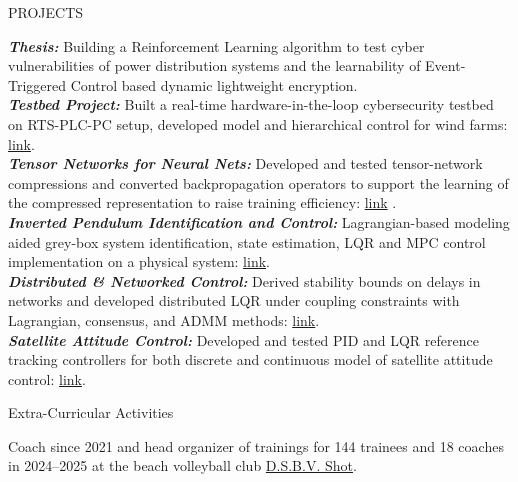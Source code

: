 \documentclass{resume} %
\begin{document}

\begin{rSection}{PROJECTS}


\textbf{\textit{Thesis:}} Building a Reinforcement Learning algorithm to test cyber vulnerabilities of power distribution systems and the learnability of Event-Triggered Control based dynamic lightweight encryption. \vspace*{1mm}\\
\textbf{\textit{Testbed Project:}} Built a real-time hardware-in-the-loop cybersecurity testbed on RTS-PLC-PC setup, developed model and hierarchical control for wind farms: \href{https://github.com/arondomotorkohlheb/off_testbed}{link}. \vspace*{1mm}\\
\textbf{\textit{Tensor Networks for Neural Nets:}} Developed and tested tensor-network compressions and converted backpropagation operators to support the learning of the compressed representation to raise training efficiency: \href{}{link} \vspace*{1mm}.\\
\textbf{\textit{Inverted Pendulum Identification and Control:}} Lagrangian-based modeling aided grey-box system identification, state estimation, LQR and MPC control implementation on a physical system: \href{}{link}.\vspace*{1mm}\\
\textbf{\textit{Distributed \& Networked Control:}} Derived stability bounds on delays in networks and developed distributed LQR under coupling constraints with Lagrangian, consensus, and ADMM methods: \href{}{link}. \vspace*{1mm}\\
\textbf{\textit{Satellite Attitude Control:}} Developed and tested PID and LQR reference tracking controllers for both discrete and continuous model of satellite attitude control: \href{}{link}.
\end{rSection}
\begin{rSection}{Extra-Curricular Activities} 

Coach since 2021 and head organizer of trainings for 144 trainees and 18 coaches in 2024--2025 at the beach volleyball club \href{https://www.shotbeach.nl/}{D.S.B.V. Shot}. 


\end{rSection}
\end{document}
